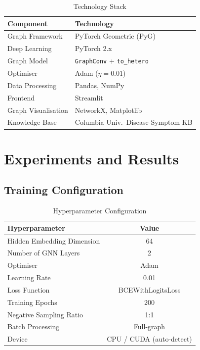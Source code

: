 \documentclass[conference]{IEEEtran}
\begin{document}
\begin{table}[htbp]
  \centering
  \caption{Technology Stack}
  \label{tab:techstack}
  \renewcommand{\arraystretch}{1.25}
  \begin{tabular}{ll}
    \toprule
    \textbf{Component}   & \textbf{Technology} \\
    \midrule
    Graph Framework      & PyTorch Geometric (PyG) \\
    Deep Learning        & PyTorch 2.x \\
    Graph Model          & \texttt{GraphConv} + \texttt{to\_hetero} \\
    Optimiser            & Adam ($\eta=0.01$) \\
    Data Processing      & Pandas, NumPy \\
    Frontend             & Streamlit \\
    Graph Visualisation  & NetworkX, Matplotlib \\
    Knowledge Base       & Columbia Univ.\ Disease-Symptom KB \\
    \bottomrule
  \end{tabular}
\end{table}

\section{Experiments and Results}
\label{sec:experiments}

\subsection{Training Configuration}

\begin{table}[htbp]
  \centering
  \caption{Hyperparameter Configuration}
  \label{tab:hyperparams}
  \renewcommand{\arraystretch}{1.25}
  \begin{tabular}{lc}
    \toprule
    \textbf{Hyperparameter} & \textbf{Value} \\
    \midrule
    Hidden Embedding Dimension  & 64 \\
    Number of GNN Layers        & 2  \\
    Optimiser                   & Adam \\
    Learning Rate               & 0.01 \\
    Loss Function               & BCEWithLogitsLoss \\
    Training Epochs             & 200 \\
    Negative Sampling Ratio     & 1:1 \\
    Batch Processing            & Full-graph \\
    Device                      & CPU / CUDA (auto-detect) \\
    \bottomrule
  \end{tabular}
\end{table}
\end{document}

